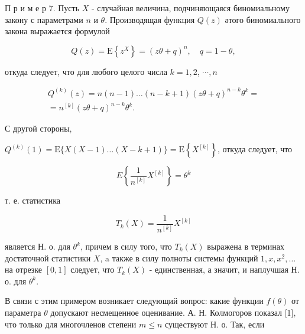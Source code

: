 \documentclass[10pt]{article}
\begin{document}
П р и м е р 7. Пусть $X$ - случайная величина, подчиняющаяся биномиальному закону с параметрами $n$ и $\theta$. Производящая функция $Q(z)$ әтого биномиального закона выражается формулой



\[

Q(z)=\mathrm{E}\left\{z^{X}\right\}=(z \theta+q)^{n}, \quad q=1-\theta,

\]



откуда следует, что для любого целого числа $k=1,2$, $\cdots, n$



\[

\begin{gathered}

Q^{(k)}(z)=n(n-1) \ldots(n-k+1)(z \theta+q)^{n-k} \theta^{k}= \\

=n^{[k]}(z \theta+q)^{n-k} \theta^{k} .

\end{gathered}

\]



С другой стороны,



$Q^{(k)}(1)=\mathrm{E}\{X(X-1) \ldots(X-k+1)\}=\mathrm{E}\left\{X^{[k]}\right\}$, откуда следует, что



\[

E\left\{\frac{1}{n^{[k]}} X^{[k]}\right\}=\theta^{k}

\]



т. е. статистика



\[

T_{k}(X)=\frac{1}{n^{[k]}} X^{[k]}

\]



является Н. о. для $\theta^{k}$, причем в силу того, что $T_{k}(X)$ выражена в терминах достаточной статистики $X$, a также в силу полноты системы функций $1, x, x^{2}, \ldots$ на отрезке $[0,1]$ следует, что $T_{k}(X)$ - единственная, а значит, и наплучшая Н. о. для $\theta^{k}$.



В связи с этим примером возникает следующий вопрос: какие функции $f(\theta)$ от параметра $\theta$ допускают несмещенное оценивание. А. Н. Колмогоров показал [1], что только для многочленов степени $m \leqslant n$ существуют Н. о. Так, если
\end{document}
